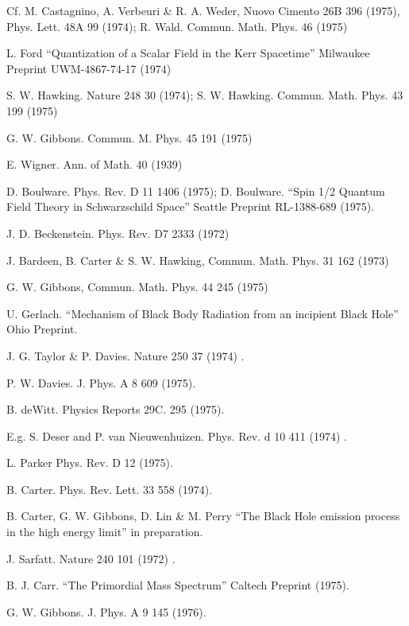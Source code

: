 \begin{thebibliography}{100}
\bibitem[22]{} Cf. M. Castagnino, A. Verbeuri \& R. A. Weder,
Nuovo Cimento 26B 396 (1975), Phys. Lett. 48A 99 (1974);
R. Wald. Commun. Math. Phys. 46 (1975)

\bibitem[23]{} L. Ford ``Quantization of a Scalar Field in the Kerr Spacetime'' Milwaukee Preprint UWM-4867-74-17 (1974)

\bibitem[24]{} S. W. Hawking. Nature 248 30 (1974); S. W. Hawking. Commun. Math. Phys.
43 199 (1975)

\bibitem[25]{} G. W. Gibbons. Commun. M. Phys. 45 191 (1975)

\bibitem[26]{} E. Wigner. Ann. of Math. 40 (1939)

\bibitem[27]{} D. Boulware. Phys. Rev. D 11 1406 (1975); D. Boulware. ``Spin 1/2 Quantum
Field Theory in Schwarzschild Space'' Seattle Preprint RL-1388-689 (1975).

\bibitem[28]{} J. D. Beckenstein. Phys. Rev. D7 2333 (1972)

\bibitem[29]{} J. Bardeen, B. Carter \& S. W. Hawking, Commun. Math. Phys. 31 162 (1973)

\bibitem[30]{} G. W. Gibbons, Commun. Math. Phys. 44 245 (1975)

\bibitem[31]{} U. Gerlach. ``Mechanism of Black Body Radiation from an incipient Black
Hole'' Ohio Preprint.

\bibitem[32]{} J. G. Taylor \& P. Davies. Nature 250 37 (1974) .

\bibitem[33]{} P. W. Davies. J. Phys. A 8 609 (1975).

\bibitem[34]{} B. deWitt. Physics Reports 29C. 295 (1975).

\bibitem[35]{} E.g. S. Deser and P. van Nieuwenhuizen. Phys. Rev. d 10 411 (1974) .

\bibitem[36]{} L. Parker Phys. Rev. D 12 (1975).

\bibitem[37]{} B. Carter. Phys. Rev. Lett. 33 558 (1974).

\bibitem[38]{} B. Carter, G. W. Gibbons, D. Lin \& M. Perry ``The Black Hole emission
process in the high energy limit'' in preparation.

\bibitem[39]{} J. Sarfatt. Nature 240 101 (1972) .

\bibitem[40]{} B. J. Carr. ``The Primordial Mass Spectrum'' Caltech Preprint (1975).

\bibitem[41]{} G. W. Gibbons. J. Phys. A 9 145 (1976).

\end{thebibliography}

